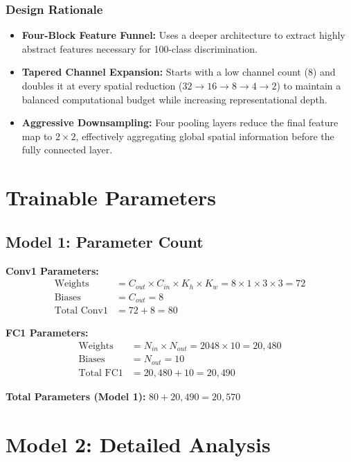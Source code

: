 \documentclass[11pt,a4paper]{article}
\begin{document}
\subsubsection{Design Rationale}
    \begin{itemize}
        \item \textbf{Four-Block Feature Funnel:} Uses a deeper architecture to extract highly abstract features necessary 
        for 100-class discrimination.
        \item \textbf{Tapered Channel Expansion:} Starts with a low channel count (8) and doubles it at every spatial 
        reduction ($32 \to 16 \to 8 \to 4 \to 2$) to maintain a balanced computational budget while increasing representational depth.
        \item \textbf{Aggressive Downsampling:} Four pooling layers reduce the final feature map to $2 \times 2$, effectively 
        aggregating global spatial information before the fully connected layer.
    \end{itemize}

\section{Trainable Parameters}

\subsection{Model 1: Parameter Count}

\textbf{Conv1 Parameters:}
\begin{align*}
\text{Weights} &= C_{out} \times C_{in} \times K_h \times K_w = 8 \times 1 \times 3 \times 3 = 72 \\
\text{Biases} &= C_{out} = 8 \\
\text{Total Conv1} &= 72 + 8 = 80
\end{align*}

\textbf{FC1 Parameters:}
\begin{align*}
\text{Weights} &= N_{in} \times N_{out} = 2048 \times 10 = 20,480 \\
\text{Biases} &= N_{out} = 10 \\
\text{Total FC1} &= 20,480 + 10 = 20,490
\end{align*}

\textbf{Total Parameters (Model 1):} $80 + 20,490 = \boxed{20,570}$

\section{Model 2: Detailed Analysis}
\end{document}
